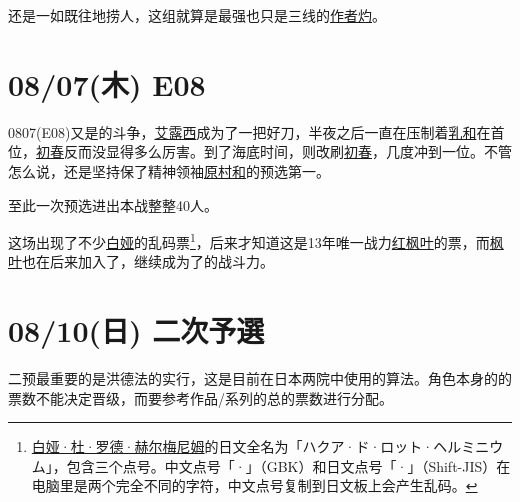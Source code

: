 还是一如既往地捞人，这组就算是最强也只是三线的\uline{作者灼}。

\section{08/07(木) E08}


0807(E08)又是的斗争，\uline{艾露西}成为了一把好刀，半夜之后一直在压制着\uline{乳和}在首位，\uline{初春}反而没显得多么厉害。到了海底时间，则改刷\uline{初春}，几度冲到一位。不管怎么说，还是坚持保了精神领袖\uline{原村和}的预选第一。

至此一次预选进出本战整整40人。

这场出现了不少\uline{白娅}的乱码票\footnote{\uline{白娅·杜·罗德·赫尔梅尼姆}的日文全名为「{\mincho ハクア·ド·ロット·ヘルミニウム}」，包含三个点号。中文点号「·」（GBK）和日文点号「{\mincho ·}」（Shift-JIS）在电脑里是两个完全不同的字符，中文点号复制到日文板上会产生乱码。}，后来才知道这是13年唯一战力\uline{红枫叶}的票，而\uline{枫叶}也在后来加入了，继续成为了的战斗力。

\section{08/10(日) 二次予選}

二预最重要的是洪德法的实行，这是目前在日本两院中使用的算法。角色本身的的票数不能决定晋级，而要参考作品/系列的总的票数进行分配。

